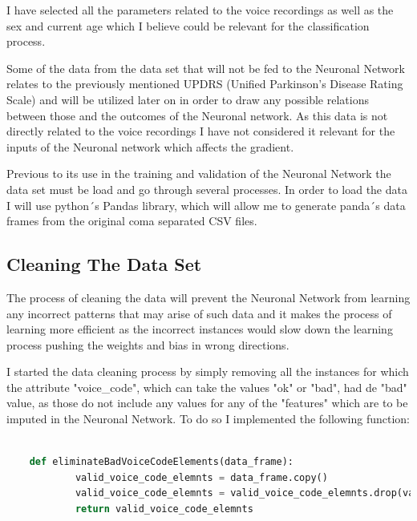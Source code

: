 \documentclass[12pt, a4paper]{article}
\begin{document}
	\vspace{5mm}
	
	
	\vspace{5mm}
	
	I have selected all the parameters related to the voice recordings as well as the sex and current age which I believe could be relevant for the classification process.
	 
	Some of the data from the data set that will not be fed to the Neuronal Network relates to the previously mentioned UPDRS (Unified Parkinson's Disease Rating Scale) and will be utilized later on in order to draw any possible relations between those and the outcomes of the Neuronal network. As this data is not directly related to the voice recordings I have not considered it relevant for the inputs of the Neuronal network which affects the gradient.
	
	Previous to its use in the training and validation of the Neuronal Network the data set must be load and go through several processes. In order to load the data I will use python´s Pandas library, which will allow me to generate panda´s data frames from the original coma separated CSV files.
	
	\clearpage
	
	\subsection{Cleaning The Data Set }
	
	The process of cleaning the data will prevent the Neuronal Network from learning any incorrect patterns that may arise of such data and it makes the process of learning more efficient as the incorrect instances would slow down the learning process pushing the weights and bias in wrong directions.
	
	I started the data cleaning process by simply removing all the instances for which the attribute "voice\_code", which can take the values "ok" or "bad", had de "bad" value, as those do not include any values for any of the "features" which are to be imputed in the Neuronal Network. To do so I implemented the following function:
	
	\vspace{5mm}
	
	\begin{lstlisting}[language=Python]
		
	def eliminateBadVoiceCodeElements(data_frame):
			valid_voice_code_elemnts = data_frame.copy()
			valid_voice_code_elemnts = valid_voice_code_elemnts.drop(valid_voice_code_elemnts[valid_voice_code_elemnts["voice_code"] == "bad" ].index)
			return valid_voice_code_elemnts
	\end{lstlisting}
	
\end{document}
